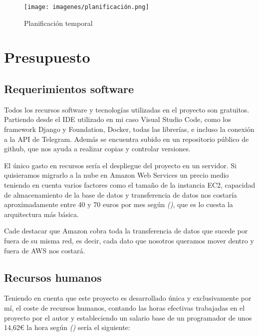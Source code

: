\begin{figure}[!ht]
    \centering
    \texttt{[image: imagenes/planificación.png]}
    \caption{ Planificación temporal }
    \label{fig:planificacion}
\end{figure}
\vspace{1cm}

\section{Presupuesto}

\subsection{Requerimientos software}

Todos los recursos software y tecnologías utilizadas en el proyecto son gratuitos. Partiendo desde el IDE utilizado en mi caso Visual Studio Code, como los framework Django y Foundation, Docker, todas las librerías, e incluso la conexión a la API de Telegram. Además se encuentra subido en un repositorio público de github, que nos ayuda a realizar copias y controlar versiones. 

El único gasto en recursos sería el despliegue del proyecto en un servidor. Si quisieramos migrarlo a la nube en Amazon Web Services un precio medio teniendo en cuenta varios factores como el tamaño de la instancia EC2, capacidad de almacenamiento de la base de datos y transferencia de datos nos costaría aproximadamente entre 40 y 70 euros por mes según \textit{(\cite{aws2022})}, que es lo cuesta la arquitectura más básica. 

Cade destacar que Amazon cobra toda la transferencia de datos que sucede por fuera de su misma red, es decir, cada dato que nosotros queramos mover dentro y fuera de AWS nos costará.


\subsection{Recursos humanos}


Teniendo en cuenta que este proyecto es desarrollado única y exclusivamente por mí, el coste de recursos humanos, contando las horas efectivas trabajadas en el proyecto por el autor y estableciendo un salario base de un programador de unos 14,62€ la hora según  \textit{(\cite{salario2022})} sería el siguiente:\vspace{0.5cm}


